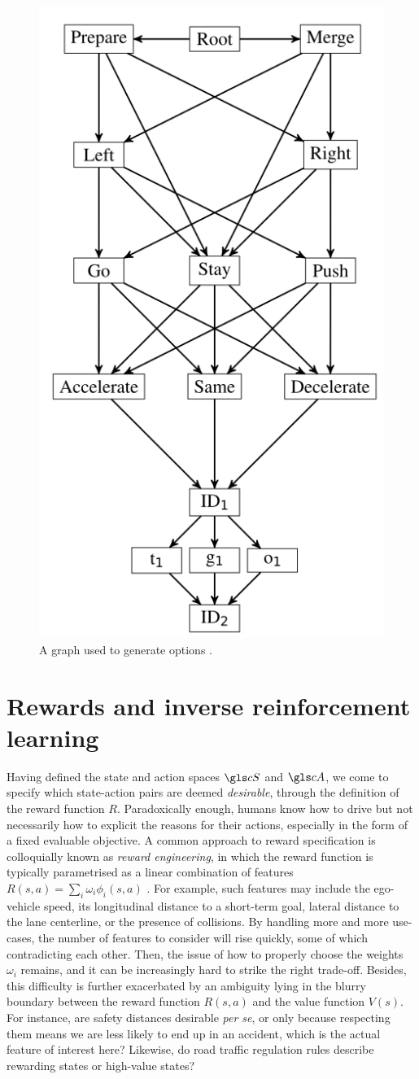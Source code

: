\begin{figure}[th]
	\centering
	\includegraphics[width=0.3\linewidth]{img/options}
	\caption{A graph used to generate options \citep{ShalevShwartz2016}.}
	\label{fig:options-graph}
\end{figure}

\section{Rewards and inverse reinforcement learning}
\label{sec:irl}

Having defined the state and action spaces $\cS$ and $\cA$, we come to specify which state-action pairs are deemed \emph{desirable}, through the definition of the reward function $R$. Paradoxically enough, humans know how to drive but not necessarily how to explicit the reasons for their actions, especially in the form of a fixed evaluable objective. A common approach to reward specification is colloquially known as \emph{reward engineering}, in which the reward function is typically parametrised as a linear combination of features $R(s,a) = \sum_i \omega_i \phi_i(s,a)$ . For example, such features may include the ego-vehicle speed, its longitudinal distance to a short-term goal, lateral distance to the lane centerline, or the presence of collisions.
By handling more and more use-cases, the number of features to consider will rise quickly, some of which contradicting each other. Then, the issue of how to properly choose the weights $\omega_i$ remains, and it can be increasingly hard to strike the right trade-off.
Besides, this difficulty is further exacerbated by an ambiguity lying in the blurry boundary between the reward function $R(s,a)$ and the value function $V(s)$. For instance, are safety distances desirable \textit{per se}, or only because respecting them means we are less likely to end up in an accident, which is the actual feature of interest here? Likewise, do road traffic regulation rules describe rewarding states or high-value states?

